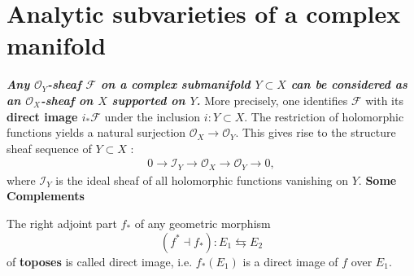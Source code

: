 \section{Analytic subvarieties of a complex manifold}
\textit{\textbf{Any $\mathcal{O}_Y$-sheaf $\mathcal{F}$ on a complex submanifold $Y \subset X$ can be considered as an $\mathcal{O}_X$-sheaf on $X$ supported on $Y$.}} More precisely, one identifies $\mathcal{F}$ with its \textbf{\color{purple} direct image $i_* \mathcal{F}$} under the inclusion $i: Y \subset X$. The restriction of holomorphic functions yields a natural surjection $\mathcal{O}_X \rightarrow \mathcal{O}_Y$. This gives rise to the structure sheaf sequence of $Y \subset X$ :
\begin{align*}
0 \longrightarrow \mathcal{I}_Y \longrightarrow \mathcal{O}_X \longrightarrow \mathcal{O}_Y \longrightarrow 0,
\end{align*}
where $\mathcal{I}_Y$ is the ideal sheaf of all holomorphic functions vanishing on $Y$.
\textbf{Some Complements}

\begin{definition}
The right adjoint part $f_*$ of any geometric morphism 
\[
  (f^*\dashv f_*) \colon E_1 \leftrightarrows E_2
\]
of \textbf{toposes} is called direct image, i.e. $f_* (E_1)$ is a direct image of $f$ over $E_1$.
\end{definition}

